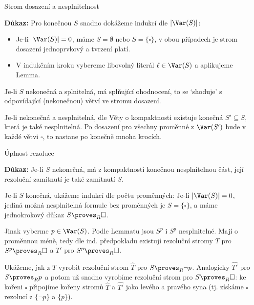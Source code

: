 \documentclass{beamer}
\begin{document}
\begin{frame}{Strom dosazení a nesplnitelnost}
    
    \pause

    \textbf{Důkaz:} 
        Pro \alert{konečnou} $S$ snadno dokážeme indukcí dle $|\Var(S)|$: \pause
        \begin{itemize}
            \item Je-li $|\Var(S)|=0$, máme $S=\emptyset$ nebo $S=\{\square\}$, v obou případech je strom dosazení jednoprvkový a tvrzení platí. \pause
            \item V indukčním kroku vybereme libovolný literál $\ell\in\Var(S)$ a aplikujeme Lemma.\pause
        \end{itemize} 
    Je-li $S$ \alert{nekonečná a splnitelná}, má splňující ohodnocení, to se `shoduje' s odpovídající (nekonečnou) větví ve stromu dosazení. \pause
    
    Je-li \alert{nekonečná a nesplnitelná}, dle Věty o kompaktnosti existuje konečná $S'\subseteq S$, která je také nesplnitelná. Po dosazení pro všechny proměnné z $\Var(S')$ bude v každé větvi $\square$, to nastane po konečně mnoha krocích.
    \hfill\qedsymbol

\end{frame}


\begin{frame}{Úplnost rezoluce}

    \pause

    \textbf{Důkaz:} \alert{Je-li $S$ nekonečná}, má z kompaktnosti konečnou nesplnitelnou část, její rezoluční zamítnutí je také zamítnutí $S$. \pause
    
    \alert{Je-li $S$ konečná}, ukážeme indukcí dle počtu proměnných: \pause Je-li $|\Var(S)|=0$, jediná možná nesplnitelná formule bez proměnných je $S=\{\square\}$, a máme jednokrokový důkaz $S\proves_R\square$. \pause
    
    Jinak vyberme $p\in\Var(S)$. \pause Podle Lemmatu jsou $S^p$ i $S^{\bar p}$ nesplnitelné. \pause Mají o proměnnou méně, tedy dle ind. předpokladu existují rezoluční stromy $T$ pro $S^p\proves_R\square$ a $T'$ pro $S^{\bar p}\proves_R\square$.\pause

    Ukážeme, jak z $T$ vyrobit rezoluční strom $\widehat T$ pro $S\proves_R \neg p$. \pause Analogicky $\widehat{T'}$ pro $S\proves_R p$ a potom už snadno vyrobíme rezoluční strom pro $S\proves_R\square$: \pause ke kořeni $\square$ připojíme kořeny stromů $\widehat T$ a $\widehat{T'}$ jako levého a pravého syna (tj. získáme $\square$ rezolucí z $\{\neg p\}$ a $\{p\}$).

\end{frame}
\end{document}
